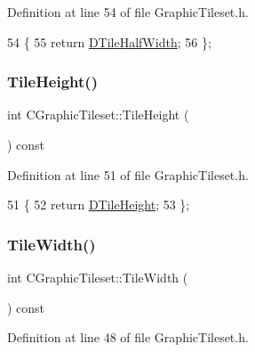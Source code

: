 Definition at line 54 of file Graphic\+Tileset.\+h.


\begin{DoxyCode}
54                                  \{
55             \textcolor{keywordflow}{return} \hyperlink{classCGraphicTileset_a3e82808009078ce29f6b74bcd077b251}{DTileHalfWidth};
56         \};
\end{DoxyCode}
\hypertarget{classCGraphicTileset_a42aa03d1183ea881ce9d7b5545b564f3}{}\label{classCGraphicTileset_a42aa03d1183ea881ce9d7b5545b564f3} 
\subsubsection{\texorpdfstring{Tile\+Height()}{TileHeight()}}
{\footnotesize\ttfamily int C\+Graphic\+Tileset\+::\+Tile\+Height (\begin{DoxyParamCaption}{ }\end{DoxyParamCaption}) const\hspace{0.3cm}{\ttfamily [inline]}}



Definition at line 51 of file Graphic\+Tileset.\+h.


\begin{DoxyCode}
51                               \{
52             \textcolor{keywordflow}{return} \hyperlink{classCGraphicTileset_af48f32e07d5fe69afd5f764318cc3244}{DTileHeight};
53         \};
\end{DoxyCode}
\hypertarget{classCGraphicTileset_af53f4cda22019c25b1f6ce05d5a1bdcd}{}\label{classCGraphicTileset_af53f4cda22019c25b1f6ce05d5a1bdcd} 
\subsubsection{\texorpdfstring{Tile\+Width()}{TileWidth()}}
{\footnotesize\ttfamily int C\+Graphic\+Tileset\+::\+Tile\+Width (\begin{DoxyParamCaption}{ }\end{DoxyParamCaption}) const\hspace{0.3cm}{\ttfamily [inline]}}



Definition at line 48 of file Graphic\+Tileset.\+h.


